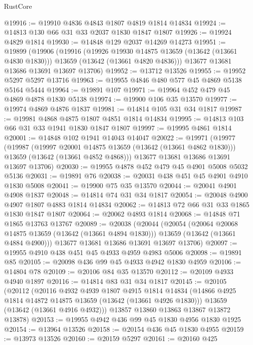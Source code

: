 \begin{lexlean}{RustCore}
\begin{coremodule}
@19916 := @19910 @4836 @4843 @1807 @4819 @1814 @14834
@19924 := @14813 @130 @66 @31 @33 @2037 @1830 @1847 @1807
@19926 := @19924 @4829 @1814
@19930 := @14848 @129 @2037 @14269 @14273
@19951 := @19899
    (@19906
      (@19916
        (@19926 @19930 @14875 @13659 (@13642 (@13661 @4830 @1830)))
        @13659
        (@13642 (@13661 @4820 @4836)))
      @13677
      @13681
      @13686
      @13691
      @13697
      @13706)
@19952 := @13712 @13526
@19955 := @19952 @5297 @5297 @13716
@19963 := @19955 @4846 @480 @577 @45 @4869 @5138 @5164 @5444
@19964 := @19891 @107
@19971 := @19964 @452 @479 @45 @4869 @4878 @1830 @5138
@19974 := @19900 @106 @35 @13570
@19977 := @19974 @4869 @4876 @1837
@19981 := @14814 @105 @31 @34 @1817
@19987 := @19981 @4868 @4875 @1807 @4851 @1814 @14834
@19995 := @14813 @103 @66 @31 @33 @1941 @1830 @1847 @1807
@19997 := @19995 @4861 @1814
@20001 := @14848 @102 @1941 @14043 @14047
@20022 := @19971
    (@19977
      (@19987
        (@19997 @20001 @14875 @13659 (@13642 (@13661 @4862 @1830)))
        @13659
        (@13642 (@13661 @4852 @4868)))
      @13677
      @13681
      @13686
      @13691
      @13697
      @13706)
@20030 := @19955 @4878 @452 @479 @45 @4901 @5008 @5032 @5136
@20031 := @19891 @76
@20038 := @20031 @438 @451 @45 @4901 @4910 @1830 @5008
@20041 := @19900 @75 @35 @13570
@20044 := @20041 @4901 @4908 @1837
@20048 := @14814 @74 @31 @34 @1817
@20054 := @20048 @4900 @4907 @1807 @4883 @1814 @14834
@20062 := @14813 @72 @66 @31 @33 @1865 @1830 @1847 @1807
@20064 := @20062 @4893 @1814
@20068 := @14848 @71 @1865 @13763 @13767
@20089 := @20038
    (@20044
      (@20054
        (@20064 @20068 @14875 @13659 (@13642 (@13661 @4894 @1830)))
        @13659
        (@13642 (@13661 @4884 @4900)))
      @13677
      @13681
      @13686
      @13691
      @13697
      @13706)
@20097 := @19955 @4910 @438 @451 @45 @4933 @4959 @4983 @5006
@20098 := @19891 @85
@20105 := @20098 @436 @99 @45 @4933 @4942 @1830 @4959
@20106 := @14804 @78
@20109 := @20106 @84 @35 @13570
@20112 := @20109 @4933 @4940 @1897
@20116 := @14814 @83 @31 @34 @1817
@20145 := @20105
    (@20112
      (@20116
        @4932
        @4939
        @1807
        @4915
        @1814
        @14834
        (@14866 @4925 @1814 @14872 @14875 @13659 (@13642 (@13661 @4926 @1830)))
        @13659
        (@13642 (@13661 @4916 @4932)))
      @13857
      @13860
      @13863
      @13867
      @13872
      @13878)
@20153 := @19955 @4942 @436 @99 @45 @1830 @4956 @1830 @1925
@20154 := @13964 @13526
@20158 := @20154 @436 @45 @1830 @4955
@20159 := @13973 @13526
@20160 := @20159 @5297
@20161 := @20160 @425

\end{coremodule}
\end{lexlean}
